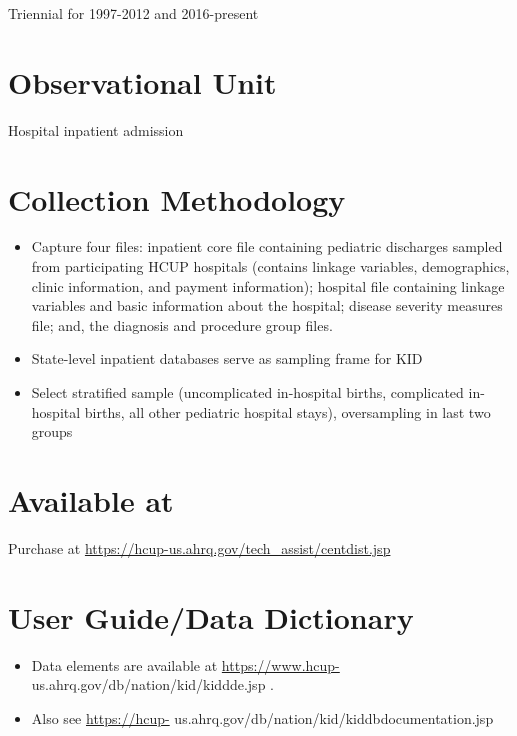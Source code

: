 \documentclass[
]{book}
\providecommand{\tightlist}{%
  \setlength{\itemsep}{0pt}\setlength{\parskip}{0pt}}
\begin{document}
Triennial for 1997-2012 and 2016-present

\hypertarget{observational-unit-35}{%
\section{Observational Unit}\label{observational-unit-35}}

Hospital inpatient admission

\hypertarget{collection-methodology-35}{%
\section{Collection Methodology}\label{collection-methodology-35}}

\begin{itemize}
\tightlist
\item
  Capture four files: inpatient core file containing pediatric discharges sampled from participating HCUP hospitals (contains linkage variables, demographics, clinic information, and payment information); hospital file containing linkage variables and basic information about the hospital; disease severity measures file; and, the diagnosis and procedure group files.
\item
  State-level inpatient databases serve as sampling frame for KID
\item
  Select stratified sample (uncomplicated in-hospital births, complicated in-hospital births, all other pediatric hospital stays), oversampling in last two groups
\end{itemize}

\hypertarget{available-at-35}{%
\section{Available at}\label{available-at-35}}

Purchase at \url{https://hcup-us.ahrq.gov/tech_assist/centdist.jsp}

\hypertarget{user-guidedata-dictionary-35}{%
\section{User Guide/Data Dictionary}\label{user-guidedata-dictionary-35}}

\begin{itemize}
\tightlist
\item
  Data elements are available at \url{https://www.hcup-} us.ahrq.gov/db/nation/kid/kiddde.jsp .
\item
  Also see \url{https://hcup-} us.ahrq.gov/db/nation/kid/kiddbdocumentation.jsp
\end{itemize}
\end{document}
